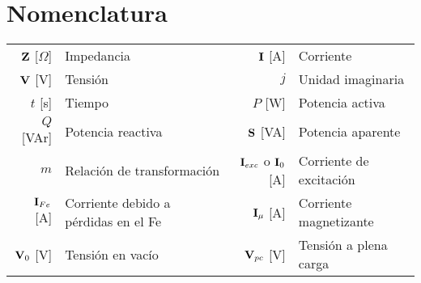 \documentclass[11pt,a4paper]{article}
\begin{document}
	\pagestyle{pieyencabezado}
	\section*{Nomenclatura}
	
	\begin{tabular}{r l r l}
		$\fasor{Z}$ [$\Omega$]& Impedancia &
		$\fasor{i}$ [A] & Corriente \\
		$\fasor{v}$ [V] & Tensión&
		$j$ & Unidad imaginaria \\
		$t$ [s] & Tiempo &
		$P$ [W] & Potencia activa \\
		$Q$ [VAr] & Potencia reactiva &
		$\fasor{s}$ [VA] & Potencia aparente \\
		$m$ & Relación de transformación&
		$\fasor{I}_{exc}$ o $\fasor{I}_0$ [A] & Corriente de excitación\\
		$\fasor{I}_{Fe}$ [A] & Corriente debido a pérdidas en el Fe&
		$\fasor{I}_{\mu}$ [A] & Corriente magnetizante\\
		$\fasor{v}_0$ [V] & Tensión en vacío & $\fasor{v}_{pc}$ [V] & Tensión a plena carga \\
	\end{tabular}
	


	
\end{document}
